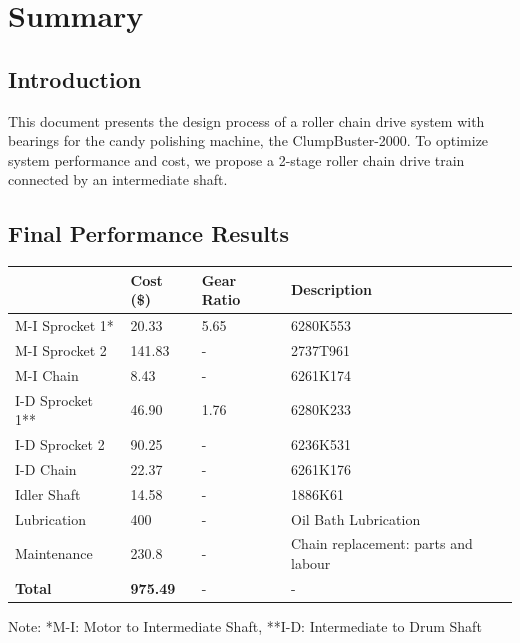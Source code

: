 \documentclass[letterpaper,12pt]{article}
\begin{document}
\section{Summary}
\subsection{Introduction}
This document presents the design process of a roller chain drive system with bearings for the candy polishing machine, the ClumpBuster-2000. To optimize system performance and cost, we propose a 2-stage roller chain drive train connected by an intermediate shaft.

\subsection{Final Performance Results}
\begin{center}
	\begin{tabular}{ |p{3cm}||p{2cm}|p{2cm}|p{7cm}|  }
		\hline
		 & Cost (\$) & Gear Ratio & Description \\
		\hline
		M-I Sprocket 1* &20.33 & 5.65 & 6280K553 \\
		M-I Sprocket 2 &141.83 & - & 2737T961 \\
		M-I Chain & 8.43 & - & 6261K174 \\
		I-D Sprocket 1** & 46.90 & 1.76 & 6280K233 \\
		I-D Sprocket 2 & 90.25 & - & 6236K531 \\
		I-D Chain & 22.37 & - & 6261K176 \\
		Idler Shaft &14.58 & - & 1886K61\\
		\hline
		\hline
		Lubrication & 400&- & Oil Bath Lubrication\\
		\hline
		\hline
		Maintenance & 230.8& - & Chain replacement: parts and labour\\
		\hline
		\hline
		\textbf{Total} & \textbf{975.49}& - & - \\
		\hline
	\end{tabular}
\end{center}
\noindent Note: *M-I: Motor to Intermediate Shaft, **I-D: Intermediate to Drum Shaft
\end{document}
